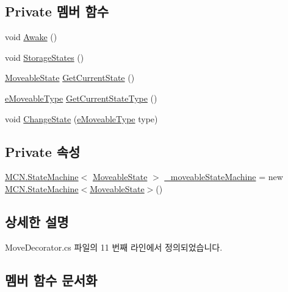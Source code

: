 \subsection*{Private 멤버 함수}
\begin{DoxyCompactItemize}
\item 
void \hyperlink{class_move_decorator_a18f4c0f61c6b2581ebf291f976cb2756}{Awake} ()
\item 
void \hyperlink{class_move_decorator_a1a8b4d4a8a56735f3b33ea0912526cde}{Storage\+States} ()
\item 
\hyperlink{class_move_decorator_1_1_moveable_state}{Moveable\+State} \hyperlink{class_move_decorator_ad6f988cbbd3dce9e33bb0c08609f012f}{Get\+Current\+State} ()
\item 
\hyperlink{_move_decorator_8cs_a90215797ba850e199f3ef63d7c56f132}{e\+Moveable\+Type} \hyperlink{class_move_decorator_a4da4b651ccf38b250af93eaeeddd1912}{Get\+Current\+State\+Type} ()
\item 
void \hyperlink{class_move_decorator_ac7ad3c87a970caf3ddd8ea0b74276d30}{Change\+State} (\hyperlink{_move_decorator_8cs_a90215797ba850e199f3ef63d7c56f132}{e\+Moveable\+Type} type)
\end{DoxyCompactItemize}
\subsection*{Private 속성}
\begin{DoxyCompactItemize}
\item 
\hyperlink{class_m_c_n_1_1_state_machine}{M\+C\+N.\+State\+Machine}$<$ \hyperlink{class_move_decorator_1_1_moveable_state}{Moveable\+State} $>$ \hyperlink{class_move_decorator_a699616462ff8c3f628be94d157064c79}{\+\_\+moveable\+State\+Machine} = new \hyperlink{class_m_c_n_1_1_state_machine}{M\+C\+N.\+State\+Machine}$<$\hyperlink{class_move_decorator_1_1_moveable_state}{Moveable\+State}$>$()
\end{DoxyCompactItemize}


\subsection{상세한 설명}


Move\+Decorator.\+cs 파일의 11 번째 라인에서 정의되었습니다.



\subsection{멤버 함수 문서화}
